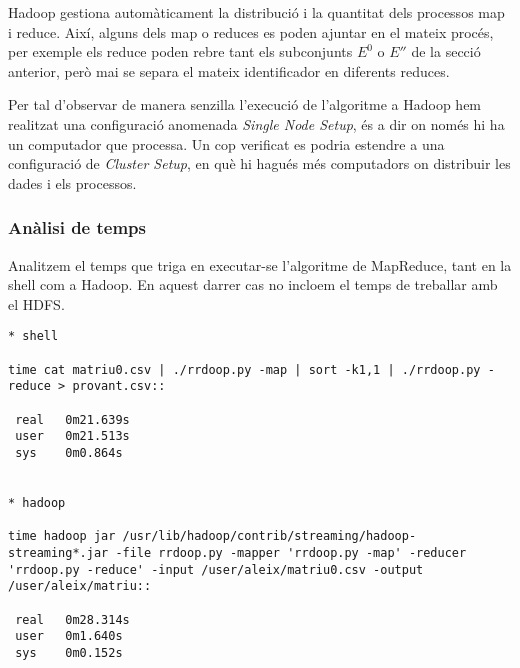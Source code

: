 Hadoop gestiona automàticament la distribució i la quantitat dels
processos map i reduce. Així, alguns dels map o reduces es poden
ajuntar en el mateix procés, per exemple els reduce poden rebre tant
els subconjunts $E^0$ o $E''$ de la secció anterior, però mai se
separa el mateix identificador en diferents reduces.


Per tal d'observar de manera senzilla l'execució de l'algoritme a
Hadoop hem realitzat una configuració anomenada \emph{Single Node
  Setup}, és a dir on només hi ha un computador que processa.  Un cop
verificat es podria estendre a una configuració de \emph{Cluster
  Setup}, en què hi hagués més computadors on distribuir les dades i
els processos.




\subsubsection{Anàlisi de temps}

Analitzem el temps que triga en executar-se l'algoritme de MapReduce,
tant en la shell com a Hadoop. En aquest darrer cas no incloem el
temps de treballar amb el \gls{HDFS}.


\begin{verbatim}
* shell

time cat matriu0.csv | ./rrdoop.py -map | sort -k1,1 | ./rrdoop.py -reduce > provant.csv::

 real   0m21.639s
 user   0m21.513s
 sys    0m0.864s


* hadoop

time hadoop jar /usr/lib/hadoop/contrib/streaming/hadoop-streaming*.jar -file rrdoop.py -mapper 'rrdoop.py -map' -reducer 'rrdoop.py -reduce' -input /user/aleix/matriu0.csv -output /user/aleix/matriu::

 real   0m28.314s
 user   0m1.640s
 sys    0m0.152s
\end{verbatim}














